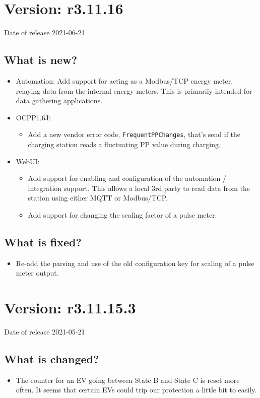 \documentclass{scrartcl}
\begin{document}
\section{Version: r3.11.16}
Date of release 2021-06-21
\subsection*{What is new?}
\begin{itemize}
\item Automation: Add support for acting as a Modbus/TCP energy meter, relaying
  data from the internal energy meters. This is primarily intended for data
  gathering applications.
\item OCPP1.6J:
  \begin{itemize}
  \item Add a new vendor error code, \verb|FrequentPPChanges|, that's send if
    the charging station reads a fluctuating PP value during charging.
  \end{itemize}
\item WebUI:
  \begin{itemize}
  \item Add support for enabling and configuration of the automation /
    integration support. This allows a local 3rd party to read data from the
    station using either MQTT or Modbus/TCP.
  \item Add support for changing the scaling factor of a pulse meter.
  \end{itemize}
\end{itemize}
\subsection*{What is fixed?}
\begin{itemize}
\item Re-add the parsing and use of the old configuration key for scaling of a
  pulse meter output.
\end{itemize}

\section{Version: r3.11.15.3}
Date of release 2021-05-21
\subsection*{What is changed?}
\begin{itemize}
\item The counter for an EV going between State B and State C is reset more
  often. It seems that certain EVs could trip our protection a little bit to
  easily.
\end{itemize}
\end{document}
